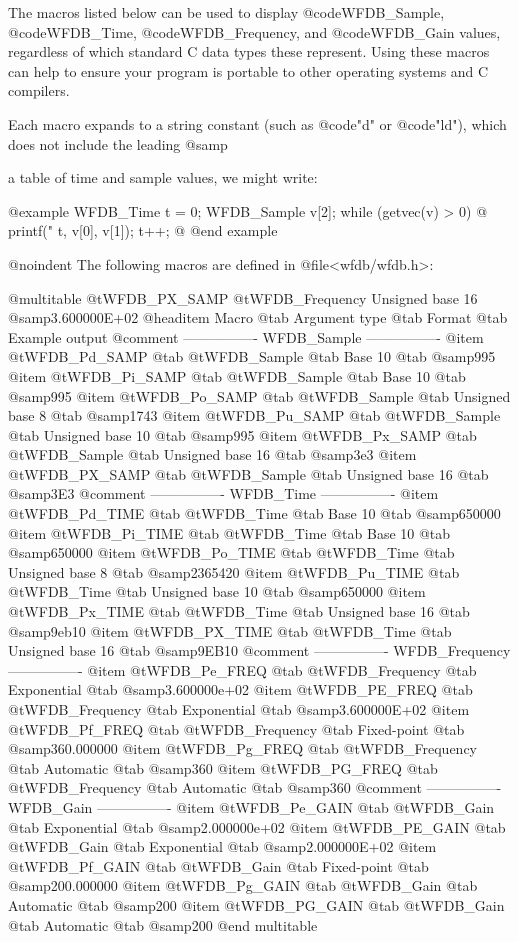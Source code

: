 {{{{{{{{{{The macros listed below can be used to display @code{WFDB_Sample},
@code{WFDB_Time}, @code{WFDB_Frequency}, and @code{WFDB_Gain} values,
regardless of which standard C data types these represent.  Using these macros
can help to ensure your program is portable to other operating systems and C
compilers.

Each macro expands to a string constant (such as @code{"d"} or @code{"ld"}),
which does not include the leading @samp{%
a table of time and sample values, we might write:

@example
WFDB_Time t = 0;
WFDB_Sample v[2];
while (getvec(v) > 0) @{
    printf("%
           t, v[0], v[1]);
    t++;
@}
@end example

@noindent
The following macros are defined in @file{<wfdb/wfdb.h>}:

@multitable {@t{WFDB_PX_SAMP}} {@t{WFDB_Frequency}} {Unsigned base 16} {@samp{3.600000E+02}}
@headitem Macro
@tab Argument type
@tab Format
@tab Example output
@comment ---------------- WFDB_Sample ----------------
@item @t{WFDB_Pd_SAMP} @tab @t{WFDB_Sample} @tab Base 10
@tab @samp{995}
@item @t{WFDB_Pi_SAMP} @tab @t{WFDB_Sample} @tab Base 10
@tab @samp{995}
@item @t{WFDB_Po_SAMP} @tab @t{WFDB_Sample} @tab Unsigned base 8
@tab @samp{1743}
@item @t{WFDB_Pu_SAMP} @tab @t{WFDB_Sample} @tab Unsigned base 10
@tab @samp{995}
@item @t{WFDB_Px_SAMP} @tab @t{WFDB_Sample} @tab Unsigned base 16
@tab @samp{3e3}
@item @t{WFDB_PX_SAMP} @tab @t{WFDB_Sample} @tab Unsigned base 16
@tab @samp{3E3}
@comment ---------------- WFDB_Time ----------------
@item @t{WFDB_Pd_TIME} @tab @t{WFDB_Time} @tab Base 10
@tab @samp{650000}
@item @t{WFDB_Pi_TIME} @tab @t{WFDB_Time} @tab Base 10
@tab @samp{650000}
@item @t{WFDB_Po_TIME} @tab @t{WFDB_Time} @tab Unsigned base 8
@tab @samp{2365420}
@item @t{WFDB_Pu_TIME} @tab @t{WFDB_Time} @tab Unsigned base 10
@tab @samp{650000}
@item @t{WFDB_Px_TIME} @tab @t{WFDB_Time} @tab Unsigned base 16
@tab @samp{9eb10}
@item @t{WFDB_PX_TIME} @tab @t{WFDB_Time} @tab Unsigned base 16
@tab @samp{9EB10}
@comment ---------------- WFDB_Frequency ----------------
@item @t{WFDB_Pe_FREQ} @tab @t{WFDB_Frequency} @tab Exponential
@tab @samp{3.600000e+02}
@item @t{WFDB_PE_FREQ} @tab @t{WFDB_Frequency} @tab Exponential
@tab @samp{3.600000E+02}
@item @t{WFDB_Pf_FREQ} @tab @t{WFDB_Frequency} @tab Fixed-point
@tab @samp{360.000000}
@item @t{WFDB_Pg_FREQ} @tab @t{WFDB_Frequency} @tab Automatic
@tab @samp{360}
@item @t{WFDB_PG_FREQ} @tab @t{WFDB_Frequency} @tab Automatic
@tab @samp{360}
@comment ---------------- WFDB_Gain ----------------
@item @t{WFDB_Pe_GAIN} @tab @t{WFDB_Gain} @tab Exponential
@tab @samp{2.000000e+02}
@item @t{WFDB_PE_GAIN} @tab @t{WFDB_Gain} @tab Exponential
@tab @samp{2.000000E+02}
@item @t{WFDB_Pf_GAIN} @tab @t{WFDB_Gain} @tab Fixed-point
@tab @samp{200.000000}
@item @t{WFDB_Pg_GAIN} @tab @t{WFDB_Gain} @tab Automatic
@tab @samp{200}
@item @t{WFDB_PG_GAIN} @tab @t{WFDB_Gain} @tab Automatic
@tab @samp{200}
@end multitable

}}}}}}}}}}}

